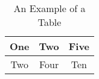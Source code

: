 \documentclass[journal]{IAENGtran}
\begin{document}


%
%


%

\begin{table}[!t]
\renewcommand{\arraystretch}{1.3}
\caption{An Example of a Table} \label{table_example}
\centering
\begin{tabular}{|c||c||c|}
\hline
One & Two & Five\\
\hline
Two & Four & Ten\\
\hline
\end{tabular}
\end{table}
\end{document}
